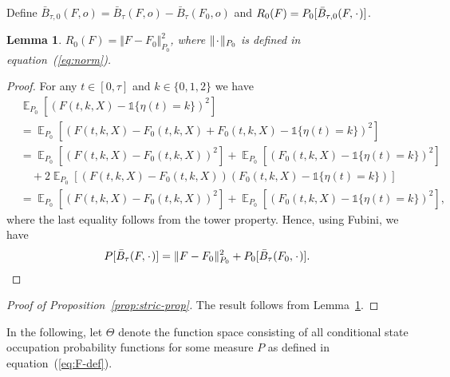 \documentclass{statsoc}
\newtheorem{lemma}{Lemma}
\DeclareMathOperator{\E}{\mathbb{E}} %
\newcommand{\blank}{\makebox[1ex]{\textbf{$\cdot$}}}
\newcommand{\1}{\mathds{1}}
\begin{document}
Define
\( \bar{B}_{\tau,0}(F, o) = \bar{B}_{\tau}(F, o) - \bar{B}_{\tau}(F_0, o) \) and
\( R_{0}(F) = P_0{[\bar{B}_{\tau,0}(F, \blank)]} \).
\begin{lemma}
  \label{lemma:norm}
  \( R_{0}(F) = \Vert F - F_0 \Vert_{P_0}^2 \), where \( \Vert \blank \Vert_{P_0}\) is defined
  in equation~(\ref{eq:norm}).
\end{lemma}
\begin{proof}
  For any \( t \in [0, \tau] \) and \( k\in \{0,1,2\} \) we have
  \begin{align*}
    & \E_{P_0}{\left[ (F(t, k, X) - \1{\{\eta(t) = k \}})^2 \right]}
    \\
    & =    \E_{P_0}{\left[ (F(t, k, X) - F_0(t, k, X) + F_0(t, k, X) - \1{\{\eta(t) = k
      \}})^2 \right]}
    \\
    & =    \E_{P_0}{\left[ (F(t, k, X) - F_0(t, k, X))^2\right]}
      + \E_{P_0}{\left[ (F_0(t, k, X) - \1{\{\eta(t) = k \}})^2\right]}
    \\
    & \quad
      + 2\E_{P_0}{\left[ (F(t, k, X) - F_0(t, k, X))(F_0(t, k, X) - \1{\{\eta(t) = k
      \}})\right]}
    \\
    & =    \E_{P_0}{\left[ (F(t, k, X) - F_0(t, k, X))^2\right]}
      + \E_{P_0}{\left[ (F_0(t, k, X) - \1{\{\eta(t) = k \}})^2\right]},
  \end{align*}
  where the last equality follows from the tower property. Hence, using Fubini,
  we have
  \begin{equation*}
    P{[\bar{B}_{\tau}(F, \blank)]}
    = \Vert F - F_0 \Vert_{P_0}^2 + P_0{[\bar{B}_{\tau}(F_0, \blank)]}.
  \end{equation*}
\end{proof}

\begin{proof}[Proof of Proposition~\ref{prop:stric-prop}]
  The result follows from Lemma~\ref{lemma:norm}.
\end{proof}

In the following, let $\Theta$ denote the function space consisting of all
conditional state occupation probability functions for some measure \( P \) as
defined in equation~(\ref{eq:F-def}).
\end{document}
